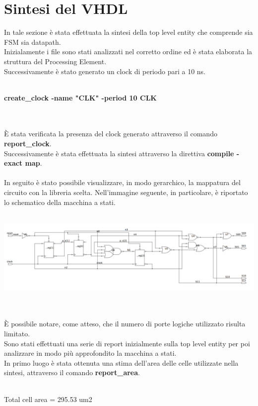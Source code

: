 \documentclass[11pt,  english, makeidx, a4paper, titlepage, oneside]{book}
\begin{document}
\section{Sintesi del VHDL} 
In tale sezione è stata effettuata la sintesi della top level entity che comprende sia FSM sia datapath.
\\
Inizialamente i file sono stati analizzati nel corretto ordine ed è stata elaborata la struttura del Processing Element.
\\
Successivamente è stato generato un clock di periodo pari a 10 ns.
\\\\
\centerline{\textbf{create\_clock -name "CLK" -period 10 {CLK}} }
\\\\
È stata verificata la presenza del clock generato attraverso il comando \textbf{report\_clock}.
\\
Successivamente è stata effettuata la sintesi attraverso la direttiva \textbf{compile -exact map}.
\\\\
In seguito è stato possibile visualizzare, in modo gerarchico, la mappatura del circuito con la libreria scelta. Nell'immagine seguente, in particolare, è riportato lo schematico della macchina a stati.
\\\\
\centerline{\includegraphics[width=15cm]{./img/Lab_2/FSM_Schematic.png}}
\\\\ 
È possibile notare, come atteso, che il numero di porte logiche utilizzato risulta limitato.
\\
Sono stati effettuati una serie di report inizialmente sulla top level entity per poi analizzare in modo più approfondito la macchina a stati.
\\
In primo luogo è stata ottenuta una stima dell'area delle celle utilizzate nella sintesi, attraverso il comando \textbf{report\_area}.
\\\\
\centerline{Total cell area = 295.53 um2}
\\\\
\end{document}
